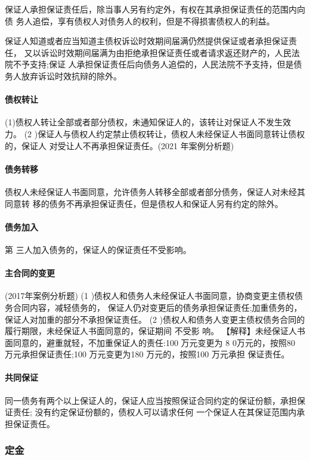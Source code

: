 \documentclass[UTF8,12pt]{ctexart}
\numberwithin{equation}{section} %
\numberwithin{figure}{section}
\numberwithin{table}{section}
\begin{document}
	保证人承担保证责任后，除当事人另有约定外，有权在其承担保证责任的范围内向债 务人追偿，享有债权人对债务人的权利，但是不得损害债权人的利益。
	
	保证人知道或者应当知道主债权诉讼时效期间届满仍然提供保证或者承担保证责任， 又以诉讼时效期间届满为由拒绝承担保证责任或者请求返还财产的，人民法院不予支持;保证 人承担保证责任后向债务人追偿的，人民法院不予支持，但是债务人放弃诉讼时效抗辩的除外。
	
	\paragraph{债权转让} (1)债权人转让全部或者部分债权，未通知保证人的，该转让对保证人不发生效力。
	(2 )保证人与债权人约定禁止债权转让，债权人未经保证人书面同意转让债权的，保证人 对受让人不再承担保证责任。(2021 年案例分析题)
	
	\paragraph{债务转移} 债权人未经保证人书面同意，允许债务人转移全部或者部分债务，保证人对未经其同意转 移的债务不再承担保证责任，但是债权人和保证人另有约定的除外。
	
	\paragraph{债务加入}
	第 三人加入债务的，保证人的保证责任不受影响。
	
	\paragraph{主合同的变更}(2017年案例分析题)
	(1 )债权人和债务人未经保证人书面同意，协商变更主债权债务合同内容，减轻债务的， 保证人仍对变更后的债务承担保证责任;加重债务的，保证人对加重的部分不承担保证责任。 (2 )债权人和债务人变更主债权债务合同的履行期限，未经保证人书面同意的，保证期间 不受影 响。
	【解释】未经保证人书面同意的，避重就轻，不加重保证人的责任:100 万元变更为 8 0万元的，按照80 万元承担保证责任;100 万元变更为180 万元的，按照100 万元承担 保证责任。
	
	\paragraph{共同保证} 同一债务有两个以上保证人的，保证人应当按照保证合同约定的保证份额，承担保证责任; 没有约定保证份额的，债权人可以请求任何 一个保证人在其保证范围内承担保证责任。
	\subsubsection{定金}
\end{document}
